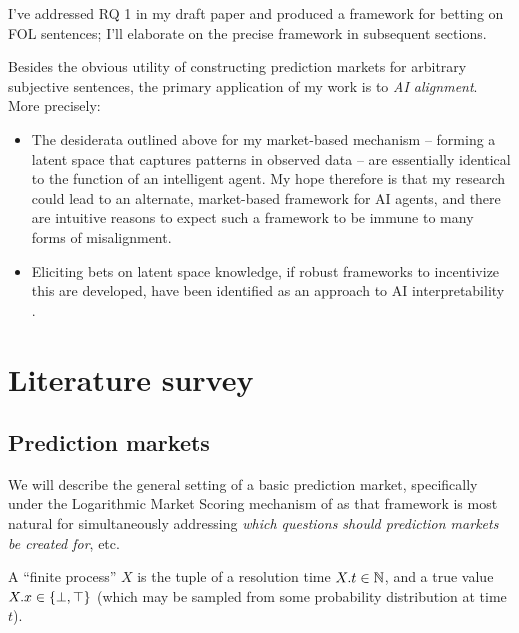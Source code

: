 \documentclass{article}
\begin{document}
\begin{work*}
    I've addressed RQ 1 in my draft paper \cite{abhimanyupallavisudhirBettingWhatNeither2023} and produced a framework for betting on FOL sentences; I'll elaborate on the precise framework in subsequent sections.
\end{work*}

\begin{applications*}
    Besides the obvious utility of constructing prediction markets for arbitrary subjective sentences, the primary application of my work is to \emph{AI alignment}. More precisely:
    \begin{itemize}
        \item The desiderata outlined above for my market-based mechanism -- forming a latent space that captures patterns in observed data -- are essentially identical to the function of an intelligent agent. My hope therefore is that my research could lead to an alternate, market-based framework for AI agents, and there are intuitive reasons to expect such a framework to be immune to many forms of misalignment.
        \item Eliciting bets on latent space knowledge, if robust frameworks to incentivize this are developed, have been identified as an approach to AI interpretability \cite{christianoElicitingLatentKnowledge2021}. 
\end{itemize}
\end{applications*}


\section{Literature survey}

\subsection{Prediction markets}

We will describe the general setting of a basic prediction market, specifically under the Logarithmic Market Scoring mechanism of \cite{hansonCombinatorialInformationMarket2003, hansonLogarithmicMarketScoring2002} as that framework is most natural for simultaneously addressing \emph{which questions should prediction markets be created for}, etc.

\begin{definition}
    A ``finite process'' $X$ is the tuple of a resolution time $X.t\in\mathbb{N}$, and a true value $X.x\in\{\bot,\top\}$ (which may be sampled from some probability distribution at time $t$).
    \label{def:finproc}
\end{definition}
\end{document}
